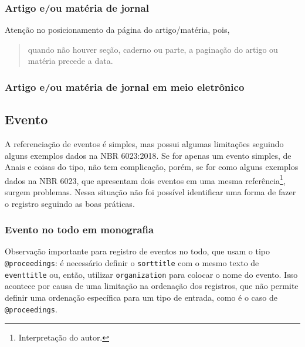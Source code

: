   \exOutros

\subsubsection{Artigo e/ou matéria de jornal} %
  Atenção no posicionamento da página do artigo/matéria, pois, \blockcquote[p. 15]{livro:abnt-nbr6023:2018}{quando não houver seção, caderno ou parte, a paginação do artigo ou matéria precede a data.}

  \exEssencial
  
  \exOutros

\subsubsection{Artigo e/ou matéria de jornal em meio eletrônico} %
  \exEssencial

  \exOutros

\subsection{Evento} %
A referenciação de eventos é simples, mas possui algumas limitações seguindo alguns exemplos dados na NBR 6023:2018. Se for apenas um evento simples, de Anais e coisas do tipo, não tem complicação, porém, se for como alguns exemplos dados na NBR 6023, que apresentam dois eventos em uma mesma referência\footnote{Interpretação do autor.}, surgem problemas. Nessa situação não foi possível identificar uma forma de fazer o registro seguindo as boas práticas.

\subsubsection{Evento no todo em monografia} %
Observação importante para registro de eventos no todo, que usam o tipo \texttt{@proceedings}: é necessário definir o \texttt{sorttitle} com o mesmo texto de \texttt{eventtitle} ou, então, utilizar \texttt{organization} para colocar o nome do evento. Isso acontece por causa de uma limitação na ordenação dos registros, que não permite definir uma ordenação específica para um tipo de entrada, como é o caso de \texttt{@proceedings}.

